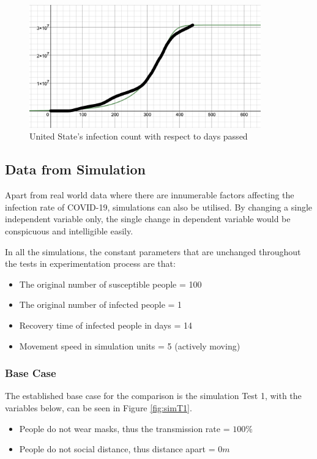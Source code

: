 \documentclass[a4paper,titlepage]{article}
\begin{document}
\begin{figure}[htbp]
    \centering
    \includegraphics[width=10cm]{rwG3.png}
    \caption{United State's infection count with respect to days passed}
    \label{fig:rwG3}
\end{figure}

\subsection{Data from Simulation}

Apart from real world data where there are innumerable factors affecting the infection rate of COVID-19, simulations can also be utilised. By changing a single independent variable only, the single change in dependent variable would be conspicuous and intelligible easily.

In all the simulations, the constant parameters that are unchanged throughout the tests in experimentation process are that:

\begin{itemize}
    \item The original number of susceptible people = 100
    \item The original number of infected people = 1
    \item Recovery time of infected people in days = 14
    \item Movement speed in simulation units = 5 (actively moving)
\end{itemize}

\subsubsection{Base Case}

The established base case for the comparison is the simulation Test 1, with the variables below, can be seen in Figure \ref{fig:simT1}.

\begin{itemize}
    \item People do not wear masks, thus the transmission rate = $100\%$
    \item People do not social distance, thus distance apart = $0\si{m}$
\end{itemize}
\end{document}
